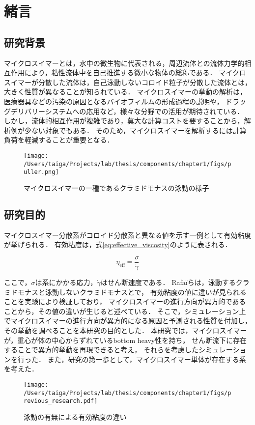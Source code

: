 \documentclass[11pt, a4j, dvipdfmx]{jarticle}
\begin{document}
\section{緒言}
\label{sec:introdction}


\subsection{研究背景}
\par
マイクロスイマーとは，水中の微生物に代表される，周辺流体との流体力学的相互作用により，粘性流体中を自己推進する微小な物体の総称である．
マイクロスイマーが分散した流体は，自己泳動しないコロイド粒子が分散した流体とは，大きく性質が異なることが知られている．
マイクロスイマーの挙動の解析は，医療器具などの汚染の原因となるバイオフィルムの形成過程の説明や，
ドラッグデリバリーシステムへの応用など，様々な分野での活用が期待されている．
しかし，流体的相互作用が複雑であり，莫大な計算コストを要することから，解析例が少ない対象でもある．
そのため，マイクロスイマーを解析するには計算負荷を軽減することが重要となる．

    \begin{figure}[htbp]
        \centering
        \texttt{[image: /Users/taiga/Projects/lab/thesis/components/chapter1/figs/puller.png]}
        \caption{マイクロスイマーの一種であるクラミドモナスの泳動の様子\cite{Chlamydomonas}}
    \end{figure}


\subsection{研究目的}
\label{sec:purpose}

\par
マイクロスイマー分散系がコロイド分散系と異なる値を示す一例として有効粘度が挙げられる．
有効粘度は，式\eqref{eq:effective_viscosity}のように表される．

    \begin{equation}
        \eta_\mathrm{eff} = \frac{\sigma}{\dot{\gamma}}
        \label{eq:effective_viscosity}
    \end{equation}

\noindent
ここで，$\sigma$は系にかかる応力，$\dot{\gamma}$はせん断速度である．
Rafa\"iらは，泳動するクラミドモナスと泳動しないクラミドモナスとで，
有効粘度の値に違いが見られることを実験により検証しており，
マイクロスイマーの進行方向が異方的であることから，その値の違いが生じると述べている\cite{effective_viscosity}．
そこで，シミュレーション上でマイクロスイマーの進行方向が異方的になる原因と予測される性質を付加し，
その挙動を調べることを本研究の目的とした．
本研究では，マイクロスイマーが，重心が体の中心からずれているbottom heavy性を持ち，
せん断流下に存在することで異方的挙動を再現できると考え，
それらを考慮したシミュレーションを行った．
また，研究の第一歩として，マイクロスイマー単体が存在する系を考えた．

    \begin{figure}[H]
        \centering
        \texttt{[image: /Users/taiga/Projects/lab/thesis/components/chapter1/figs/previous\_research.pdf]}
        \caption{泳動の有無による有効粘度の違い}
    \end{figure}
\end{document}
